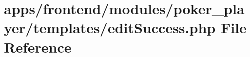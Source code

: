 \hypertarget{frontend_2modules_2poker__player_2templates_2edit_success_8php}{\section{apps/frontend/modules/poker\-\_\-player/templates/edit\-Success.php File Reference}
\label{frontend_2modules_2poker__player_2templates_2edit_success_8php}
}

